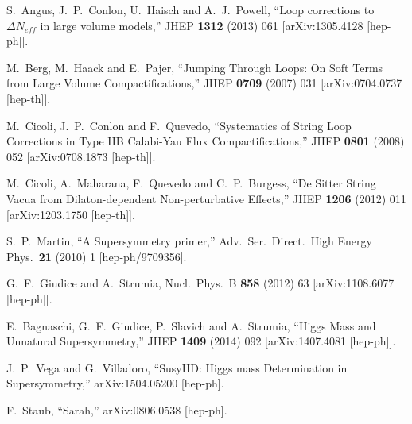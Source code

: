 \documentclass[11pt,a4paper]{article}
\begin{document}
\begin{thebibliography}{99}
  S.~Angus, J.~P.~Conlon, U.~Haisch and A.~J.~Powell,
  ``Loop corrections to $\Delta N_{eff}$ in large volume models,''
  JHEP {\bf 1312} (2013) 061
  [arXiv:1305.4128 [hep-ph]].
  
  M.~Berg, M.~Haack and E.~Pajer,
  ``Jumping Through Loops: On Soft Terms from Large Volume Compactifications,''
  JHEP {\bf 0709} (2007) 031
  [arXiv:0704.0737 [hep-th]].
    
  M.~Cicoli, J.~P.~Conlon and F.~Quevedo,
  ``Systematics of String Loop Corrections in Type IIB Calabi-Yau Flux Compactifications,''
  JHEP {\bf 0801} (2008) 052
  [arXiv:0708.1873 [hep-th]].

  M.~Cicoli, A.~Maharana, F.~Quevedo and C.~P.~Burgess,
  ``De Sitter String Vacua from Dilaton-dependent Non-perturbative Effects,''
  JHEP {\bf 1206} (2012) 011
  [arXiv:1203.1750 [hep-th]].
  
  S.~P.~Martin,
  ``A Supersymmetry primer,''
  Adv.\ Ser.\ Direct.\ High Energy Phys.\  {\bf 21} (2010) 1
  [hep-ph/9709356].
  
  G.~F.~Giudice and A.~Strumia,
  Nucl.\ Phys.\ B {\bf 858} (2012) 63
  [arXiv:1108.6077 [hep-ph]].

  E.~Bagnaschi, G.~F.~Giudice, P.~Slavich and A.~Strumia,
  ``Higgs Mass and Unnatural Supersymmetry,''
  JHEP {\bf 1409} (2014) 092
  [arXiv:1407.4081 [hep-ph]].

  J.~P.~Vega and G.~Villadoro,
  ``SusyHD: Higgs mass Determination in Supersymmetry,''
  arXiv:1504.05200 [hep-ph].

  F.~Staub,
  ``Sarah,'' arXiv:0806.0538 [hep-ph].

\end{thebibliography}
\end{document}
